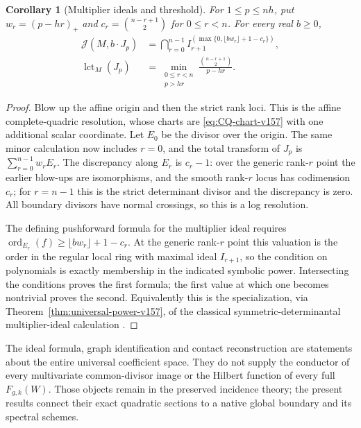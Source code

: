 \documentclass[11pt,reqno]{amsart}
\numberwithin{equation}{section}
\newtheorem{corollary}[theorem]{Corollary}
\theoremstyle{definition}\newtheorem{definition}[theorem]{Definition}
\theoremstyle{remark}\newtheorem{remark}[theorem]{Remark}
\begin{document}
\begin{corollary}[Multiplier ideals and threshold]
\label{cor:power-multiplier-v157}
For $1\leq p\leq nh$, put $w_r=(p-hr)_+$ and
$c_r=\binom{n-r+1}{2}$ for $0\leq r<n$. For every real $b\geq0$,
\begin{align}
 \mathcal J(M,b\cdot J_p)
   &=\bigcap_{r=0}^{n-1}
       I_{r+1}^{(\max\{0,\lfloor b w_r\rfloor+1-c_r\})},
                         \label{eq:power-multiplier-v157}\\
 \operatorname{lct}_M(J_p)
   &=\min_{\substack{0\leq r<n\\p>hr}}
                    \frac{\binom{n-r+1}{2}}{p-hr}.
                         \label{eq:power-lct-v157}
\end{align}
\end{corollary}
\begin{proof}
Blow up the affine origin and then the strict rank loci. This is the
affine complete-quadric resolution, whose charts are
\eqref{eq:CQ-chart-v157} with one additional scalar coordinate.
Let $E_0$ be the divisor over the origin. The same minor calculation
now includes $r=0$, and the total transform of $J_p$ is
$\sum_{r=0}^{n-1}w_rE_r$. The discrepancy along $E_r$ is $c_r-1$:
over the generic rank-$r$ point the earlier blow-ups are isomorphisms,
and the smooth rank-$r$ locus has codimension $c_r$; for $r=n-1$
this is the strict determinant divisor and the discrepancy is zero.
All boundary divisors have normal crossings, so this is a log resolution.

The defining pushforward formula for the multiplier ideal requires
$\operatorname{ord}_{E_r}(f)\geq\lfloor b w_r\rfloor+1-c_r$.
At the generic rank-$r$ point this valuation is the order in the
regular local ring with maximal ideal $I_{r+1}$, so the condition on
polynomials is exactly membership in the indicated symbolic power.
Intersecting the conditions proves the first formula; the first value
at which one becomes nontrivial proves the second. Equivalently this
is the specialization, via Theorem~\ref{thm:universal-power-v157}, of
the classical symmetric-determinantal multiplier-ideal calculation
\cite[\S2.4 and Theorem~4.8]{HenriquesVarbaro2016}.
\end{proof}

The ideal formula, graph identification and contact reconstruction are
statements about the entire universal coefficient space. They do not
supply the conductor of every multivariate common-divisor image or the
Hilbert function of every full $F_{g,k}(W)$. Those objects remain in
the preserved incidence theory; the present results connect their exact
quadratic sections to a native global boundary and its spectral schemes.
\end{document}
